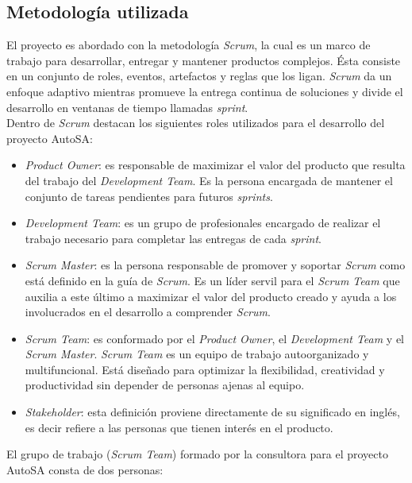 \subsection{Metodología utilizada}
El proyecto es abordado con la metodología \textit{Scrum}, la cual es un marco de trabajo para desarrollar, entregar y mantener productos complejos. Ésta consiste en un conjunto de roles, eventos, artefactos y reglas que los ligan. \textit{Scrum} da un enfoque adaptivo mientras promueve la entrega continua de soluciones y divide el desarrollo en ventanas de tiempo llamadas \textit{sprint}\cite{scrum}.\\
Dentro de \textit{Scrum} destacan los siguientes roles utilizados para el desarrollo del proyecto AutoSA\cite{scrum}:
\begin{itemize}
	\item \textit{Product Owner}: es responsable de maximizar el valor del producto que resulta del trabajo del \textit{Development Team}. Es la persona encargada de mantener el conjunto de tareas pendientes para futuros \textit{sprints}.
	\item \textit{Development Team}: es un grupo de profesionales encargado de realizar el trabajo necesario para completar las entregas de cada \textit{sprint}.
	\item \textit{Scrum Master}: es la persona responsable de promover y soportar \textit{Scrum} como está definido en la guía de \textit{Scrum}. Es un líder servil para el \textit{Scrum Team} que auxilia a este último a maximizar el valor del producto creado y ayuda a los involucrados en el desarrollo a comprender \textit{Scrum}.
	\item \textit{Scrum Team}: es conformado por el \textit{Product Owner}, el \textit{Development Team} y el \textit{Scrum Master}. \textit{Scrum Team} es un equipo de trabajo autoorganizado y multifuncional. Está diseñado para optimizar la flexibilidad, creatividad y productividad sin depender de personas ajenas al equipo.
	\item \textit{Stakeholder}: esta definición proviene directamente de su significado en inglés, es decir refiere a las personas que tienen interés en el producto.
\end{itemize}
El grupo de trabajo (\textit{Scrum Team}) formado por la consultora para el proyecto AutoSA consta de dos personas:
